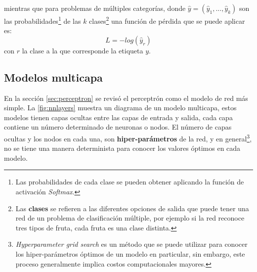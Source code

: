 mientras que para problemas de múltiples categorías, donde $\hat{y}=(\hat{y}_1, ..., \hat{y}_k)$ son las probabilidades\footnote{Las probabilidades de cada clase se pueden obtener aplicando la función de activación \emph{Softmax}.} de las $k$ clases\footnote{Las \textbf{clases} se refieren a las diferentes opciones de salida que puede tener una red de un problema de clasificación múltiple, por ejemplo si la red reconoce tres tipos de fruta, cada fruta es una clase distinta.} una función de pérdida que se puede aplicar es:
\begin{equation}
  \label{eq:otro}
  L = −log(\hat{y}_r)
\end{equation}
con $r$ la clase a la que corresponde la etiqueta $y$.

\subsection{Modelos multicapa}\label{sec:multicapamodels}
En la sección \autoref{sec:perceptron} se revisó el perceptrón como el modelo de red más simple. La \autoref{fig:nnlayers} muestra un diagrama de un modelo multicapa, estos modelos tienen capas ocultas entre las capas de entrada y salida, cada capa contiene un número determinado de neuronas o nodos. El número de capas ocultas y los nodos en cada una, son \textbf{hiper-parámetros} de la red, y en general\footnote{\emph{Hyperparameter grid search} es un método que se puede utilizar para conocer los hiper-parámetros óptimos de un modelo en particular, sin embargo, este proceso generalmente implica costos computacionales mayores.}, no se tiene una manera determinista para conocer los valores óptimos en cada modelo.

